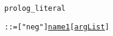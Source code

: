 
\begin{alltt}
\hypertarget{prolog_literalP\newLinkVer}{prolog_literal} ::= ["neg"] \hyperlink{name1P\linkVer}{name1} [\hyperlink{argListP\linkVer}{argList}]
\end{alltt}
